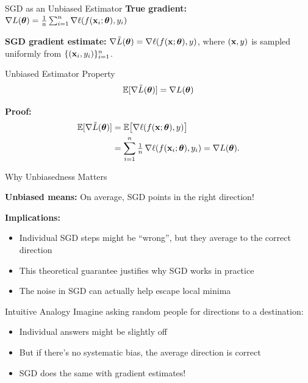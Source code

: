 \documentclass[usenames,dvipsnames]{beamer}
\newcommand{\E}{\mathbb{E}}
\begin{document}
  \begin{frame}{SGD as an Unbiased Estimator}
\textbf{True gradient:}\;
$\nabla L(\boldsymbol{\theta})=\tfrac{1}{n}\sum_{i=1}^n \nabla \ell(f(\mathbf{x}_i;\boldsymbol{\theta}),y_i)$

\pause
\textbf{SGD gradient estimate:}\;
$\nabla \tilde{L}(\boldsymbol{\theta})=\nabla \ell(f(\mathbf{x};\boldsymbol{\theta}),y)$,
where $(\mathbf{x},y)$ is sampled uniformly from $\{(\mathbf{x}_i,y_i)\}_{i=1}^n$.

\pause
\begin{theorembox}{Unbiased Estimator Property}
\[
\E[\nabla \tilde{L}(\vtheta)] = \nabla L(\vtheta)
\]
\end{theorembox}

\pause
\textbf{Proof:}
\begin{align*}
\E[\nabla \tilde{L}(\vtheta)]
&=\E\big[\nabla \ell(f(\vx;\vtheta),y)\big]\\
&=\sum_{i=1}^n \tfrac{1}{n}\,\nabla \ell(f(\vx_i;\vtheta),y_i)
= \nabla L(\vtheta).
\end{align*}
\end{frame}
  \begin{frame}{Why Unbiasedness Matters}
    \begin{keypointsbox}
    \textbf{Unbiased means:} On average, SGD points in the right direction!
    \end{keypointsbox}
    
    \pause
    \textbf{Implications:}
    \begin{itemize}[<+->]
        \item Individual SGD steps might be ``wrong'', but they average to the correct direction
        \item This theoretical guarantee justifies why SGD works in practice
        \item The noise in SGD can actually help escape local minima
    \end{itemize}
    
    \pause
    \begin{examplebox}{Intuitive Analogy}
    Imagine asking random people for directions to a destination:
    \begin{itemize}
        \item Individual answers might be slightly off
        \item But if there's no systematic bias, the average direction is correct
        \item SGD does the same with gradient estimates!
    \end{itemize}
    \end{examplebox}
  \end{frame}
\end{document}
